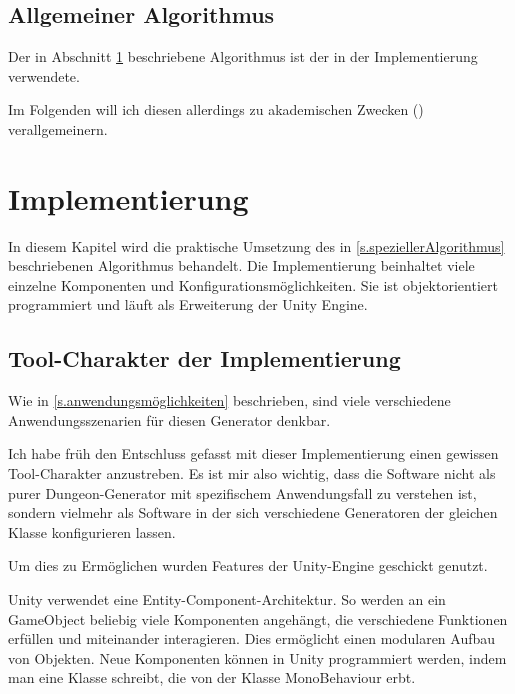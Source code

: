
\section{Allgemeiner Algorithmus}\label{s.allgemeinerAlgorithmus}

Der in Abschnitt \ref{s.allgemeinerAlgorithmus} beschriebene Algorithmus ist der in der Implementierung verwendete. 

Im Folgenden will ich diesen allerdings zu akademischen Zwecken () verallgemeinern.


\chapter{Implementierung}\label{c.implementierung}

In diesem Kapitel wird die praktische Umsetzung des in \ref{s.speziellerAlgorithmus} beschriebenen Algorithmus behandelt. Die Implementierung beinhaltet viele einzelne Komponenten und Konfigurationsmöglichkeiten. Sie ist objektorientiert programmiert und läuft als Erweiterung der Unity Engine. 

\section{Tool-Charakter der Implementierung}

Wie in \ref{s.anwendungsmöglichkeiten} beschrieben, sind viele verschiedene Anwendungsszenarien für diesen Generator denkbar. 

Ich habe früh den Entschluss gefasst mit dieser Implementierung einen gewissen Tool-Charakter anzustreben. Es ist mir also wichtig, dass die Software nicht als purer Dungeon-Generator mit spezifischem Anwendungsfall zu verstehen ist, sondern vielmehr als Software in der sich verschiedene Generatoren der gleichen Klasse konfigurieren lassen.

Um dies zu Ermöglichen wurden Features der Unity-Engine geschickt genutzt. 

Unity verwendet eine Entity-Component-Architektur. So werden an ein GameObject beliebig viele Komponenten angehängt, die verschiedene Funktionen erfüllen und miteinander interagieren. Dies ermöglicht einen modularen Aufbau von Objekten. 
\cite[Seite: GameObjects]{unityManual}
Neue Komponenten können in Unity programmiert werden, indem man eine Klasse schreibt, die von der Klasse MonoBehaviour erbt.
\cite[Seite: CreatingAndUsingScripts]{unityManual}

